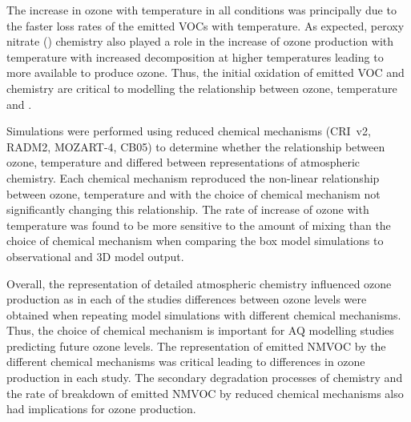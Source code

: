 The increase in ozone with temperature in all  conditions was principally due to the faster loss rates of the emitted VOCs with temperature.
As expected, peroxy nitrate () chemistry also played a role in the increase of ozone production with temperature with increased  decomposition at higher temperatures leading to more  available to produce ozone.
Thus, the initial oxidation of emitted VOC and  chemistry are critical to modelling the relationship between ozone, temperature and .

Simulations were performed using reduced chemical mechanisms (CRI~v2, RADM2, MOZART-4, CB05) to determine whether the relationship between ozone, temperature and  differed between representations of atmospheric chemistry.
Each chemical mechanism reproduced the non-linear relationship between ozone, temperature and  with the choice of chemical mechanism not significantly changing this relationship.
The rate of increase of ozone with temperature was found to be more sensitive to the amount of mixing than the choice of chemical mechanism when comparing the box model simulations to observational and 3D model output.

Overall, the representation of detailed atmospheric chemistry influenced ozone production as in each of the studies differences between ozone levels were obtained when repeating model simulations with different chemical mechanisms.
Thus, the choice of chemical mechanism is important for AQ modelling studies predicting future ozone levels.
The representation of emitted NMVOC by the different chemical mechanisms was critical leading to differences in ozone production in each study.
The secondary degradation processes of  chemistry and the rate of breakdown of emitted NMVOC by reduced chemical mechanisms also had implications for ozone production.
